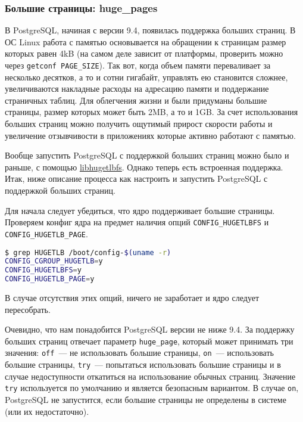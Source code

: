 \subsubsection{Большие страницы: huge\_pages}


В PostgreSQL, начиная с версии 9.4, появилась поддержка больших страниц. В ОС Linux работа с памятью основывается на обращении к страницам размер которых равен 4kB (на самом деле зависит от платформы, проверить можно через \lstinline!getconf PAGE_SIZE!). Так вот, когда объем памяти переваливает за несколько десятков, а то и сотни гигабайт, управлять ею становится сложнее, увеличиваются накладные расходы на адресацию памяти и поддержание страничных таблиц. Для облегчения жизни и были придуманы большие страницы, размер которых может быть 2MB, а то и 1GB. За счет использования больших страниц можно получить ощутимый прирост скорости работы и увеличение отзывчивости в приложениях которые активно работают с памятью.

Вообще запустить PostgreSQL с поддержкой больших страниц можно было и раньше, с помощью \href{http://www.thislinux.org/2012/08/postgresql-with-hugepages.html}{libhugetlbfs}. Однако теперь есть встроенная поддержка. Итак, ниже описание процесса как настроить и запустить PostgreSQL с поддержкой больших страниц.

Для начала следует убедиться, что ядро поддерживает большие страницы. Проверяем конфиг ядра на предмет наличия опций \lstinline!CONFIG_HUGETLBFS! и \lstinline!CONFIG_HUGETLB_PAGE!.

\begin{lstlisting}[language=Bash,label=lst:settings_hugepages1,caption=Проверка конфига ядра на поддержку huge pages]
$ grep HUGETLB /boot/config-$(uname -r)
CONFIG_CGROUP_HUGETLB=y
CONFIG_HUGETLBFS=y
CONFIG_HUGETLB_PAGE=y
\end{lstlisting}

В случае отсутствия этих опций, ничего не заработает и ядро следует пересобрать.

Очевидно, что нам понадобится PostgreSQL версии не ниже 9.4. За поддержку больших страниц отвечает параметр \lstinline!huge_page!, который может принимать три значения: \lstinline!off!~--- не использовать большие страницы, \lstinline!on!~--- использовать большие страницы, \lstinline!try!~--- попытаться использовать большие страницы и в случае недоступности откатиться на использование обычных страниц. Значение \lstinline!try! используется по умолчанию и является безопасным вариантом. В случае \lstinline!on!, PostgreSQL не запустится, если большие страницы не определены в системе (или их недостаточно).

